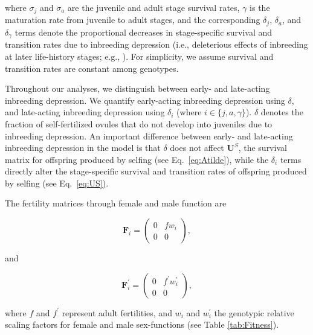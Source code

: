 \documentclass[11pt]{article}
\def\mbf#1{\mathbf{#1}}
\begin{document}
\noindent where $\sigma_j$ and $\sigma_a$ are the juvenile and adult stage survival rates, $\gamma$ is the maturation rate from juvenile to adult stages, and the corresponding $\delta_j$, $\delta_a$, and $\delta_{\gamma}$ terms denote the proportional decreases in stage-specific survival and transition rates due to inbreeding depression (i.e., deleterious effects of inbreeding at later life-history stages; e.g., \citealt{HarderRoutely2006}). For simplicity, we assume survival and transition rates are constant among genotypes. 

Throughout our analyses, we distinguish between early- and late-acting inbreeding depression. We quantify early-acting inbreeding depression using $\delta$, and late-acting inbreeding depression using $\delta_i$ (where $i \in \{j,a,\gamma\}$). $\delta$ denotes the fraction of self-fertilized ovules that do not develop into juveniles due to inbreeding depression. An important difference between early- and late-acting inbreeding depression in the model is that $\delta$ does not affect $\mbf{U}^S$, the survival matrix for offspring produced by selfing (see Eq.~\ref{eq:Atilde}), while the $\delta_i$ terms directly alter the stage-specific survival and transition rates of offspring produced by selfing (see Eq.~\ref{eq:US}).

The fertility matrices through female and male function are
\begin{linenomath*}
\begin{equation}\label{eq:FS}
	\mbf{F}_{i} = \left(
					\begin{array}{cc}
						0 & f w_{i} \\
						0 & 0
					\end{array}
				\right),
\end{equation}
\end{linenomath*}
\noindent and
\begin{linenomath*}
\begin{equation}\label{eq:FX}
	\mbf{F}^{\prime}_{i} = \left(
					\begin{array}{cc}
						0 & f^{\prime} w^{\prime}_{i} \\
						0 & 0
					\end{array}
				\right),
\end{equation}
\end{linenomath*}

\noindent where $f$ and $f^{\prime}$ represent adult fertilities, and $w_{i}$ and $w^{\prime}_{i}$ the genotypic relative scaling factors for female and male sex-functions (see Table \ref{tab:Fitness}). 
\end{document}
